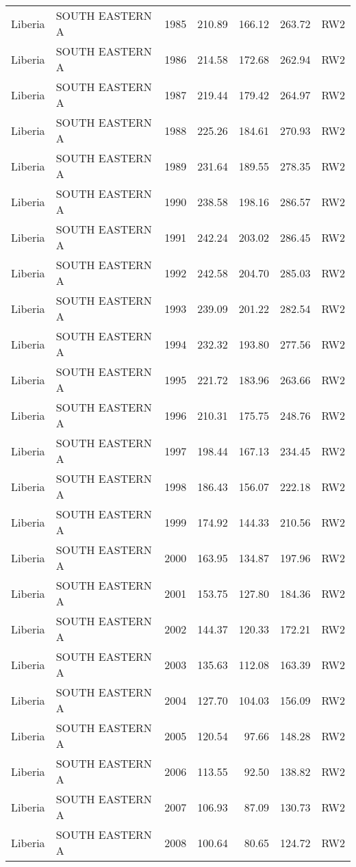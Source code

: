 \begin{longtable}{lllrrrl}
  Liberia & SOUTH EASTERN A & 1985 & 210.89 & 166.12 & 263.72 & RW2 \\ 
  Liberia & SOUTH EASTERN A & 1986 & 214.58 & 172.68 & 262.94 & RW2 \\ 
  Liberia & SOUTH EASTERN A & 1987 & 219.44 & 179.42 & 264.97 & RW2 \\ 
  Liberia & SOUTH EASTERN A & 1988 & 225.26 & 184.61 & 270.93 & RW2 \\ 
  Liberia & SOUTH EASTERN A & 1989 & 231.64 & 189.55 & 278.35 & RW2 \\ 
  Liberia & SOUTH EASTERN A & 1990 & 238.58 & 198.16 & 286.57 & RW2 \\ 
  Liberia & SOUTH EASTERN A & 1991 & 242.24 & 203.02 & 286.45 & RW2 \\ 
  Liberia & SOUTH EASTERN A & 1992 & 242.58 & 204.70 & 285.03 & RW2 \\ 
  Liberia & SOUTH EASTERN A & 1993 & 239.09 & 201.22 & 282.54 & RW2 \\ 
  Liberia & SOUTH EASTERN A & 1994 & 232.32 & 193.80 & 277.56 & RW2 \\ 
  Liberia & SOUTH EASTERN A & 1995 & 221.72 & 183.96 & 263.66 & RW2 \\ 
  Liberia & SOUTH EASTERN A & 1996 & 210.31 & 175.75 & 248.76 & RW2 \\ 
  Liberia & SOUTH EASTERN A & 1997 & 198.44 & 167.13 & 234.45 & RW2 \\ 
  Liberia & SOUTH EASTERN A & 1998 & 186.43 & 156.07 & 222.18 & RW2 \\ 
  Liberia & SOUTH EASTERN A & 1999 & 174.92 & 144.33 & 210.56 & RW2 \\ 
  Liberia & SOUTH EASTERN A & 2000 & 163.95 & 134.87 & 197.96 & RW2 \\ 
  Liberia & SOUTH EASTERN A & 2001 & 153.75 & 127.80 & 184.36 & RW2 \\ 
  Liberia & SOUTH EASTERN A & 2002 & 144.37 & 120.33 & 172.21 & RW2 \\ 
  Liberia & SOUTH EASTERN A & 2003 & 135.63 & 112.08 & 163.39 & RW2 \\ 
  Liberia & SOUTH EASTERN A & 2004 & 127.70 & 104.03 & 156.09 & RW2 \\ 
  Liberia & SOUTH EASTERN A & 2005 & 120.54 & 97.66 & 148.28 & RW2 \\ 
  Liberia & SOUTH EASTERN A & 2006 & 113.55 & 92.50 & 138.82 & RW2 \\ 
  Liberia & SOUTH EASTERN A & 2007 & 106.93 & 87.09 & 130.73 & RW2 \\ 
  Liberia & SOUTH EASTERN A & 2008 & 100.64 & 80.65 & 124.72 & RW2 \\ 

\end{longtable}
